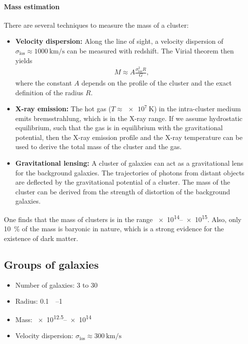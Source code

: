 \paragraph*{Mass estimation}
There are several techniques to measure the mass of a cluster:
\begin{itemize}
	\item \textbf{Velocity dispersion:}
	Along the line of sight, a velocity dispersion of $\sigma_\text{los} \approx \SI{1000}{\kilo\metre\per\second}$ can be measured with redshift.
	The Virial theorem then yields
	\begin{align*}
		M \approx A \frac{\sigma_\text{los}^2 R}{G},
	\end{align*}
	where the constant $A$ depends on the profile of the cluster and the exact definition of the radius $R$.
	\item \textbf{X-ray emission:}
	The hot gas ($T \approx \SI{e7}{\kelvin}$) in the intra-cluster medium emits bremsstrahlung, which is in the X-ray range.
	If we assume hydrostatic equilibrium, such that the gas is in equilibrium with the gravitational potential, then the X-ray emission profile and the X-ray temperature can be used to derive the total mass of the cluster and the gas.
	\item \textbf{Gravitational lensing:}
	A cluster of galaxies can act as a gravitational lens for the background galaxies.
	The trajectories of photons from distant objects are deflected by the gravitational potential of a cluster.
	The mass of the cluster can be derived from the strength of distortion of the background galaxies.
\end{itemize}

One finds that the mass of clusters is in the range \SIrange{e14}{e15}{\solarmass}.
Also, only \SI{10}{\percent} of the mass is baryonic in nature, which is a strong evidence for the existence of dark matter.





\subsection{Groups of galaxies}
\begin{itemize}
	\item Number of galaxies: 3 to 30
	\item Radius: \SIrange{0.1}{1}{\mega\parsec}
	\item Mass: \SIrange{e12.5}{e14}{\solarmass}
	\item Velocity dispersion: $\sigma_\text{los} \approx \SI{300}{\kilo\metre\per\second}$
\end{itemize}

